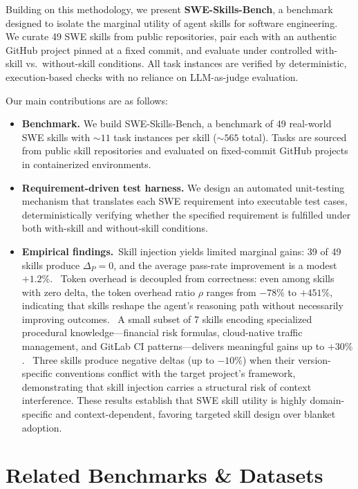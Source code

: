 \documentclass{article}
\newcommand{\circled}[1]{\tikz[baseline=(char.base)]{
  \node[shape=circle,draw,inner sep=1pt] (char) {\small #1};}}
\newcommand{\ours}{SWE-Skills-Bench}
\begin{document}
Building on this methodology, we present \textbf{\ours{}}, a benchmark designed to isolate the marginal utility of agent skills for software engineering. 
We curate 49 SWE skills from public repositories, pair each with an authentic GitHub project pinned at a fixed commit, and evaluate under controlled with-skill vs.\ without-skill conditions. 
All task instances are verified by deterministic, execution-based checks with no reliance on LLM-as-judge evaluation.

Our main contributions are as follows:
\begin{itemize}[leftmargin=*]
    \item \textbf{Benchmark.} We build \ours{}, a benchmark of 49 real-world SWE skills with ${\sim}11$ task instances per skill (${\sim}565$ total). Tasks are sourced from public skill repositories and evaluated on fixed-commit GitHub projects in containerized environments.
    \item \textbf{Requirement-driven test harness.} We design an automated unit-testing mechanism that translates each SWE requirement into executable test cases, deterministically verifying whether the specified requirement is fulfilled under both with-skill and without-skill conditions.
    \item \textbf{Empirical findings.}\circled{1}~Skill injection yields limited marginal gains: 39 of 49 skills produce $\Delta_P = 0$, and the average pass-rate improvement is a modest $+1.2\%$.
\circled{2}~Token overhead is decoupled from correctness: even among skills with zero delta, the token overhead ratio $\rho$ ranges from $-78\%$ to $+451\%$, indicating that skills reshape the agent's reasoning path without necessarily improving outcomes.
\circled{3}~A small subset of 7 skills encoding specialized procedural knowledge---financial risk formulas, cloud-native traffic management, and GitLab CI patterns---delivers meaningful gains up to $+30\%$.
\circled{4}~Three skills produce negative deltas (up to $-10\%$) when their version-specific conventions conflict with the target project's framework, demonstrating that skill injection carries a structural risk of context interference.
These results establish that SWE skill utility is highly domain-specific and context-dependent, favoring targeted skill design over blanket adoption.
\end{itemize}
\section{Related Benchmarks \& Datasets}
\label{sec:related}
\end{document}
